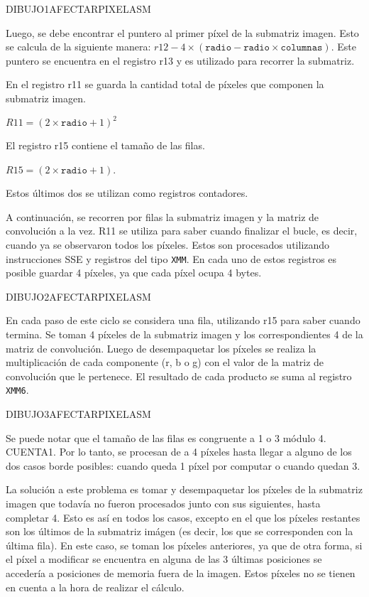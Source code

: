         DIBUJO1AFECTARPIXELASM

        Luego, se debe encontrar el puntero al primer píxel de la submatriz imagen. Esto se calcula de la siguiente manera: $r12 - 4 \times (\mathtt{radio} - \mathtt{radio} \times \mathtt{columnas})$. Este puntero se encuentra en el registro r13 y es utilizado para recorrer la submatriz. 

        En el registro r11 se guarda la cantidad total de píxeles que componen la submatriz imagen. 

              $R11 = (2 \times \mathtt{radio} + 1)^{2}$  
        
        El registro r15 contiene el tamaño de las filas.
        
              $R15 =(2 \times \mathtt{radio}  + 1)$.

        Estos últimos dos se utilizan como registros contadores.

        A continuación, se recorren por filas la submatriz imagen y la matriz de convolución a la vez. R11 se utiliza para saber cuando finalizar el bucle, es decir, cuando ya se observaron todos los píxeles. Estos son procesados utilizando instrucciones SSE y registros del tipo \texttt{XMM}. En cada uno de estos registros es posible guardar 4 píxeles, ya que cada píxel ocupa 4 bytes. 

        DIBUJO2AFECTARPIXELASM
  
        En cada paso de este ciclo se considera una fila, utilizando r15 para saber cuando termina. Se toman 4 píxeles de la submatriz imagen y los correspondientes 4 de la matriz de convolución. Luego de desempaquetar los píxeles se realiza la multiplicación de cada componente (r, b o g) con el valor de la matriz de convolución que le pertenece. El resultado de cada producto se suma al registro \texttt{XMM6}. 

        DIBUJO3AFECTARPIXELASM  

        Se puede notar que el tamaño de las filas es congruente a 1 o 3 módulo 4. 
        CUENTA1. Por lo tanto, se procesan de a 4 píxeles hasta llegar a alguno de los dos casos borde posibles: cuando queda 1 píxel por computar o cuando quedan 3. 
        
        La solución a este problema es tomar y desempaquetar los píxeles de la submatriz imagen que todavía no fueron procesados junto con sus siguientes, hasta completar 4. Esto es así en todos los casos, excepto en el que los píxeles restantes son los últimos de la submatriz imágen (es decir, los que se corresponden con la última fila). En este caso, se toman los píxeles anteriores, ya que de otra forma, si el píxel a modificar se encuentra en alguna de las 3 últimas posiciones se accedería a posiciones de memoria fuera de la imagen. Estos píxeles no se tienen en cuenta a la hora de realizar el cálculo. 
          
